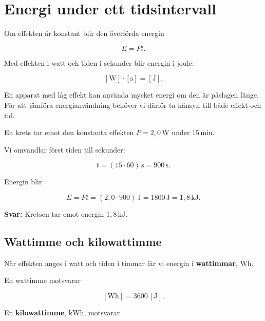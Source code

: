 \documentclass[
  swedish,
  11pt,
  a4paper,
  DIV=11,
  numbers=noendperiod,
  twoside,
  open=any]{scrreprt}
\begin{document}
\section{Energi under ett
tidsintervall}\label{sec-effekt-energi-under-ett-tidsintervall}

Om effekten är konstant blir den överförda energin

\[
\boxed{E = Pt}.
\]

Med effekten i watt och tiden i sekunder blir energin i joule:

\[
[\mathrm{W}] \cdot [\mathrm{s}] = [\mathrm{J}].
\]

En apparat med låg effekt kan använda mycket energi om den är påslagen
länge. För att jämföra energianvändning behöver vi därför ta hänsyn till
både effekt och tid.

\begin{tcolorbox}[enhanced jigsaw, arc=.35mm, bottomrule=.15mm, bottomtitle=1mm, breakable, colback=white, colbacktitle=quarto-callout-note-color!10!white, colframe=quarto-callout-note-color-frame, coltitle=black, left=2mm, leftrule=.75mm, opacityback=0, opacitybacktitle=0.6, rightrule=.15mm, title={Exempel: energi vid konstant effekt}, titlerule=0mm, toprule=.15mm, toptitle=1mm]

En krets tar emot den konstanta effekten \(P = 2{,}0\,\mathrm{W}\) under
\(15\,\mathrm{min}\).

Vi omvandlar först tiden till sekunder:

\[
t = (15 \cdot 60)\,\mathrm{s}
= 900\,\mathrm{s}.
\]

Energin blir

\[
E = Pt
= (2{,}0 \cdot 900)\,\mathrm{J}
= 1800\,\mathrm{J}
= 1{,}8\,\mathrm{kJ}.
\]

\textbf{Svar:} Kretsen tar emot energin \(1{,}8\,\mathrm{kJ}\).

\end{tcolorbox}

\subsection{Wattimme och
kilowattimme}\label{sec-effekt-wattimme-och-kilowattimme}

När effekten anges i watt och tiden i timmar får vi energin i
\textbf{wattimmar}, \(\mathrm{Wh}\).

En wattimme motsvarar

\[
[\mathrm{Wh}]
= 3600\,[\mathrm{J}].
\]

En \textbf{kilowattimme}, \(\mathrm{kWh}\), motsvarar
\end{document}

